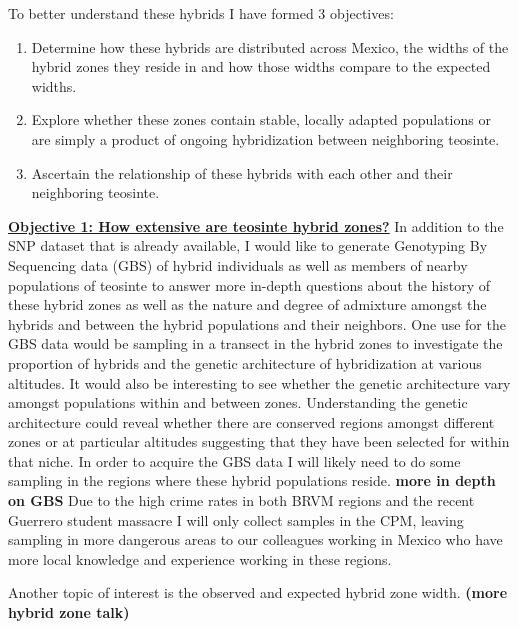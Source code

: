 \documentclass[12pt]{amsart}
\begin{document}
To better understand these hybrids I have formed 3 objectives: 
\begin{enumerate} 
	\item Determine how these hybrids are distributed across Mexico, the widths of the hybrid zones they reside in and how those widths compare to the expected widths.
	\item Explore whether these zones contain stable, locally adapted populations or are simply a product of ongoing hybridization between neighboring teosinte.
	\item Ascertain the relationship of these hybrids with each other and their neighboring teosinte.
\end{enumerate} 

\hfill\break \textbf{\underline{Objective 1: How extensive are teosinte hybrid zones?} } 
In addition to the SNP dataset that is already available, I would like to generate Genotyping By Sequencing data (GBS) of hybrid individuals as well as members of nearby populations of teosinte to answer more in-depth questions about the history of these hybrid zones as well as the nature and degree of admixture amongst the hybrids and between the hybrid populations and their neighbors.  
One use for the GBS data would be sampling in a transect in the hybrid zones to investigate the proportion of hybrids and the genetic architecture of hybridization  at various altitudes.  
It would also be interesting to see whether the genetic architecture vary amongst populations within and between zones.
Understanding the genetic architecture could reveal whether there are conserved regions amongst different zones or at particular altitudes suggesting that they have been selected for within that niche.
In order to acquire the GBS data I will likely  need to do some sampling in the regions where these hybrid populations reside.  
\textbf{more in depth on GBS}
Due to the high crime rates in both BRVM regions and the recent Guerrero student massacre I will only collect samples in the CPM, leaving sampling in more dangerous areas to our colleagues working in Mexico who have more local knowledge and experience working in these regions.

Another topic of interest is the observed and expected hybrid zone width. \textbf{(more hybrid zone talk)}
\end{document}
